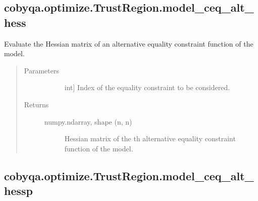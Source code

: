 \documentclass[letterpaper,10pt,english]{sphinxmanual}
\begin{document}
\begin{fulllineitems}
\begin{fulllineitems}
\end{fulllineitems}



\subsection{cobyqa.optimize.TrustRegion.model\_ceq\_alt\_hess}
\label{\detokenize{refs/generated/cobyqa.optimize.TrustRegion.model_ceq_alt_hess:cobyqa-optimize-trustregion-model-ceq-alt-hess}}\label{\detokenize{refs/generated/cobyqa.optimize.TrustRegion.model_ceq_alt_hess::doc}}

\begin{fulllineitems}
\label{\detokenize{refs/generated/cobyqa.optimize.TrustRegion.model_ceq_alt_hess:cobyqa.optimize.TrustRegion.model_ceq_alt_hess}}
\sphinxAtStartPar
Evaluate the Hessian matrix of an alternative equality constraint
function of the model.
\begin{quote}\begin{description}
\item[{Parameters}] \leavevmode\begin{description}
\item[{}] \leavevmode{[}int{]}
\sphinxAtStartPar
Index of the equality constraint to be considered.

\end{description}

\item[{Returns}] \leavevmode\begin{description}
\item[{numpy.ndarray, shape (n, n)}] \leavevmode
\sphinxAtStartPar
Hessian matrix of the \sphinxhyphen{}th alternative equality constraint
function of the model.

\end{description}

\end{description}\end{quote}

\end{fulllineitems}



\subsection{cobyqa.optimize.TrustRegion.model\_ceq\_alt\_hessp}
\label{\detokenize{refs/generated/cobyqa.optimize.TrustRegion.model_ceq_alt_hessp:cobyqa-optimize-trustregion-model-ceq-alt-hessp}}\label{\detokenize{refs/generated/cobyqa.optimize.TrustRegion.model_ceq_alt_hessp::doc}}


\end{fulllineitems}
\end{document}
